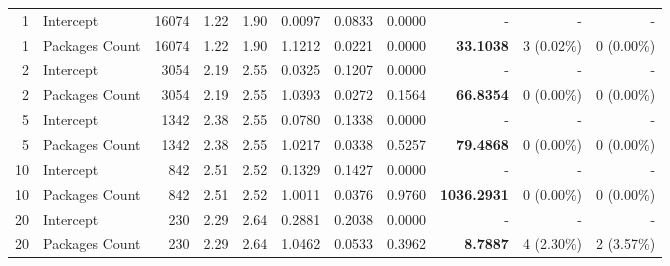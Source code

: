 \begin{landscape}
\begin{table}[H]
\begin{tabular}{r l r r r r r r r r r}
\midrule
1 & Intercept & 16074 & 1.22 & 1.90 & 0.0097 & 0.0833 & 0.0000 & - & - & - \\ 
1 & Packages Count & 16074 & 1.22 & 1.90 & 1.1212 & 0.0221 & 0.0000 & \textbf{33.1038} & 3 (0.02\%) & 0 (0.00\%) \\ 
2 & Intercept & 3054 & 2.19 & 2.55 & 0.0325 & 0.1207 & 0.0000 & - & - & - \\ 
2 & Packages Count & 3054 & 2.19 & 2.55 & 1.0393 & 0.0272 & 0.1564 & \textbf{66.8354} & 0 (0.00\%) & 0 (0.00\%) \\ 
5 & Intercept & 1342 & 2.38 & 2.55 & 0.0780 & 0.1338 & 0.0000 & - & - & - \\ 
5 & Packages Count & 1342 & 2.38 & 2.55 & 1.0217 & 0.0338 & 0.5257 & \textbf{79.4868} & 0 (0.00\%) & 0 (0.00\%) \\ 
10 & Intercept & 842 & 2.51 & 2.52 & 0.1329 & 0.1427 & 0.0000 & - & - & - \\ 
10 & Packages Count & 842 & 2.51 & 2.52 & 1.0011 & 0.0376 & 0.9760 & \textbf{1036.2931} & 0 (0.00\%) & 0 (0.00\%) \\ 
20 & Intercept & 230 & 2.29 & 2.64 & 0.2881 & 0.2038 & 0.0000 & - & - & - \\ 
20 & Packages Count & 230 & 2.29 & 2.64 & 1.0462 & 0.0533 & 0.3962 & \textbf{8.7887} & 4 (2.30\%) & 2 (3.57\%) \\ 
\bottomrule
\end{tabular}%
\label{tab:codebase_graph_latex_repository_graph_component_time_series_strategy_logistic_regressionCore_False_packages_20} 
\end{table}
\end{landscape}
\newpage 

 \newpage 
